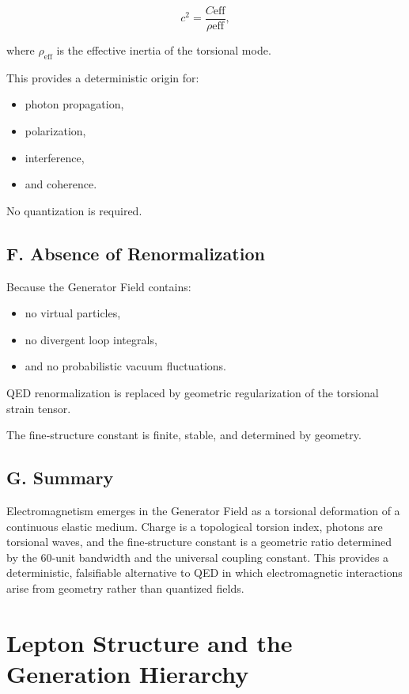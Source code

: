 \documentclass[reprint,amsmath,amssymb,aps,prl,floatfix]{revtex4-2}
\begin{document}
\[
c^2 = \frac{C{\mathrm{eff}}}{\rho{\mathrm{eff}}},
\]

where \(\rho_{\mathrm{eff}}\) is the effective inertia of the torsional mode.

This provides a deterministic origin for:

\begin{itemize}
      \item photon propagation,  
      \item polarization,  
      \item interference,  
      \item and coherence.
\end{itemize}

No quantization is required.

\subsection{F. Absence of Renormalization}

Because the Generator Field contains:

\begin{itemize}
      \item no virtual particles,  
      \item no divergent loop integrals,  
      \item and no probabilistic vacuum fluctuations.
\end{itemize}

QED renormalization is replaced by geometric regularization of the torsional strain tensor.

The fine‑structure constant is finite, stable, and determined by geometry.

\subsection{G. Summary}

Electromagnetism emerges in the Generator Field as a torsional deformation of a continuous elastic medium. Charge is a topological torsion index, photons are torsional waves, and the fine‑structure constant is a geometric ratio determined by the 60‑unit bandwidth and the universal coupling constant. This provides a deterministic, falsifiable alternative to QED in which electromagnetic interactions arise from geometry rather than quantized fields.

\section{Lepton Structure and the Generation Hierarchy}
\end{document}
